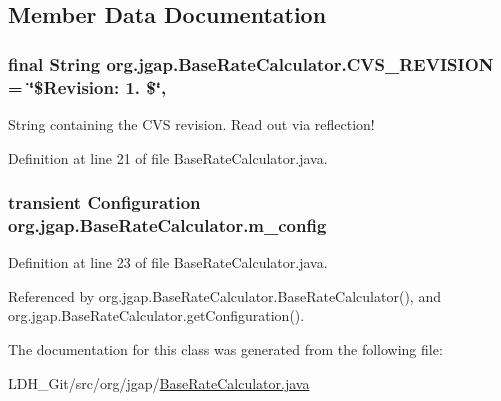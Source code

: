 \subsection{Member Data Documentation}
\hypertarget{classorg_1_1jgap_1_1_base_rate_calculator_a62f95e305b9eb1d71549fb91bbd7b013}{
\subsubsection[{C\-V\-S\-\_\-\-R\-E\-V\-I\-S\-I\-O\-N}]{\setlength{\rightskip}{0pt plus 5cm}final String org.\-jgap.\-Base\-Rate\-Calculator.\-C\-V\-S\-\_\-\-R\-E\-V\-I\-S\-I\-O\-N = \char`\"{}\$Revision\-: 1. \$\char`\"{}\hspace{0.3cm}{\ttfamily [static]}, {\ttfamily [private]}}}\label{classorg_1_1jgap_1_1_base_rate_calculator_a62f95e305b9eb1d71549fb91bbd7b013}
String containing the C\-V\-S revision. Read out via reflection! 

Definition at line 21 of file Base\-Rate\-Calculator.\-java.

\hypertarget{classorg_1_1jgap_1_1_base_rate_calculator_a8d44e6ee2a72e6249cf1f6a85de3c5ea}{
\subsubsection[{m\-\_\-config}]{\setlength{\rightskip}{0pt plus 5cm}transient {\bf Configuration} org.\-jgap.\-Base\-Rate\-Calculator.\-m\-\_\-config\hspace{0.3cm}{\ttfamily [private]}}}\label{classorg_1_1jgap_1_1_base_rate_calculator_a8d44e6ee2a72e6249cf1f6a85de3c5ea}


Definition at line 23 of file Base\-Rate\-Calculator.\-java.



Referenced by org.\-jgap.\-Base\-Rate\-Calculator.\-Base\-Rate\-Calculator(), and org.\-jgap.\-Base\-Rate\-Calculator.\-get\-Configuration().



The documentation for this class was generated from the following file\-:\begin{DoxyCompactItemize}
\item 
L\-D\-H\-\_\-\-Git/src/org/jgap/\hyperlink{_base_rate_calculator_8java}{Base\-Rate\-Calculator.\-java}\end{DoxyCompactItemize}

